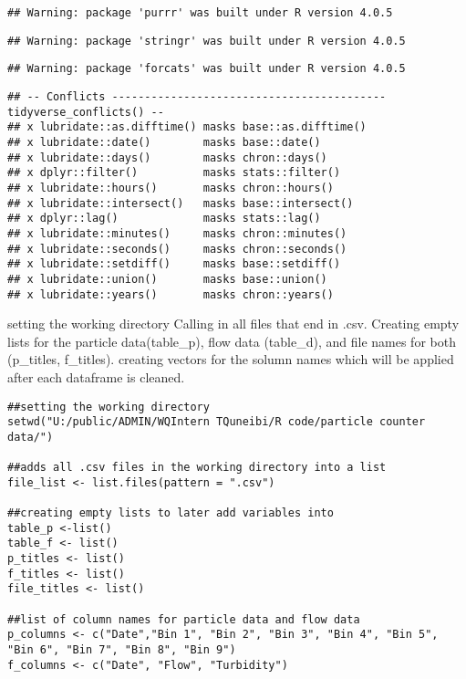 \documentclass[
]{article}
\begin{document}
\begin{verbatim}
## Warning: package 'purrr' was built under R version 4.0.5
\end{verbatim}

\begin{verbatim}
## Warning: package 'stringr' was built under R version 4.0.5
\end{verbatim}

\begin{verbatim}
## Warning: package 'forcats' was built under R version 4.0.5
\end{verbatim}

\begin{verbatim}
## -- Conflicts ------------------------------------------ tidyverse_conflicts() --
## x lubridate::as.difftime() masks base::as.difftime()
## x lubridate::date()        masks base::date()
## x lubridate::days()        masks chron::days()
## x dplyr::filter()          masks stats::filter()
## x lubridate::hours()       masks chron::hours()
## x lubridate::intersect()   masks base::intersect()
## x dplyr::lag()             masks stats::lag()
## x lubridate::minutes()     masks chron::minutes()
## x lubridate::seconds()     masks chron::seconds()
## x lubridate::setdiff()     masks base::setdiff()
## x lubridate::union()       masks base::union()
## x lubridate::years()       masks chron::years()
\end{verbatim}

setting the working directory Calling in all files that end in .csv.
Creating empty lists for the particle data(table\_p), flow data
(table\_d), and file names for both (p\_titles, f\_titles). creating
vectors for the solumn names which will be applied after each dataframe
is cleaned.

\begin{verbatim}
##setting the working directory
setwd("U:/public/ADMIN/WQIntern TQuneibi/R code/particle counter data/")

##adds all .csv files in the working directory into a list
file_list <- list.files(pattern = ".csv")

##creating empty lists to later add variables into
table_p <-list()
table_f <- list()
p_titles <- list()
f_titles <- list()
file_titles <- list()

##list of column names for particle data and flow data
p_columns <- c("Date","Bin 1", "Bin 2", "Bin 3", "Bin 4", "Bin 5", "Bin 6", "Bin 7", "Bin 8", "Bin 9")
f_columns <- c("Date", "Flow", "Turbidity")
\end{verbatim}
\end{document}
